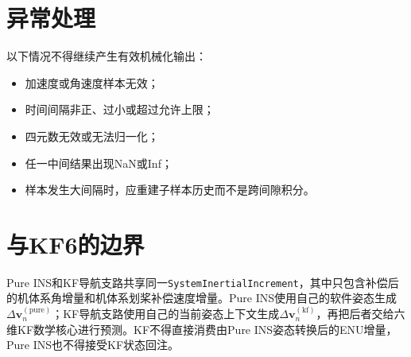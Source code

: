 \documentclass[12pt,a4paper]{ctexart}
\newcommand{\vect}[1]{\bm{#1}}
\begin{document}
\section{异常处理}
以下情况不得继续产生有效机械化输出：
\begin{itemize}[leftmargin=2em]
\item 加速度或角速度样本无效；
\item 时间间隔非正、过小或超过允许上限；
\item 四元数无效或无法归一化；
\item 任一中间结果出现NaN或Inf；
\item 样本发生大间隔时，应重建子样本历史而不是跨间隙积分。
\end{itemize}

\section{与KF6的边界}
Pure INS和KF导航支路共享同一\texttt{SystemInertialIncrement}，其中只包含补偿后的机体系角增量和机体系划桨补偿速度增量。Pure INS使用自己的软件姿态生成$\Delta\vect{v}_n^{(\mathrm{pure})}$；KF导航支路使用自己的当前姿态上下文生成$\Delta\vect{v}_n^{(\mathrm{kf})}$，再把后者交给六维KF数学核心进行预测。KF不得直接消费由Pure INS姿态转换后的ENU增量，Pure INS也不得接受KF状态回注。
\end{document}
